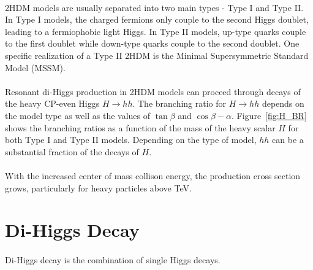 \paragraph{}
2HDM models are usually separated into two main types - Type I and Type II. In Type I models, the charged fermions only couple to the second Higgs doublet, leading to a fermiophobic light Higgs. In Type II models, up-type quarks couple to the first doublet while down-type quarks couple to the second doublet. One specific realization of a Type II 2HDM is the Minimal Supersymmetric Standard Model (MSSM).

\paragraph{}
Resonant di-Higgs production in 2HDM models can proceed through decays of the heavy CP-even Higgs $H\to hh$. The branching ratio for $H\to hh$ depends on the model type as well as the values of $\tan{\beta}$ and $\cos{\beta - \alpha}$. Figure~\ref{fig:H_BR} shows the branching ratios as a function of the mass of the heavy scalar $H$ for both Type I and Type II models. Depending on the type of model, $hh$ can be a substantial fraction of the decays of $H$. 

\paragraph{}
With the increased center of mass collison energy, the production cross section grows, particularly for heavy particles above TeV.


\section{Di-Higgs Decay}
\paragraph{}
Di-Higgs decay is the combination of single Higgs decays. 

